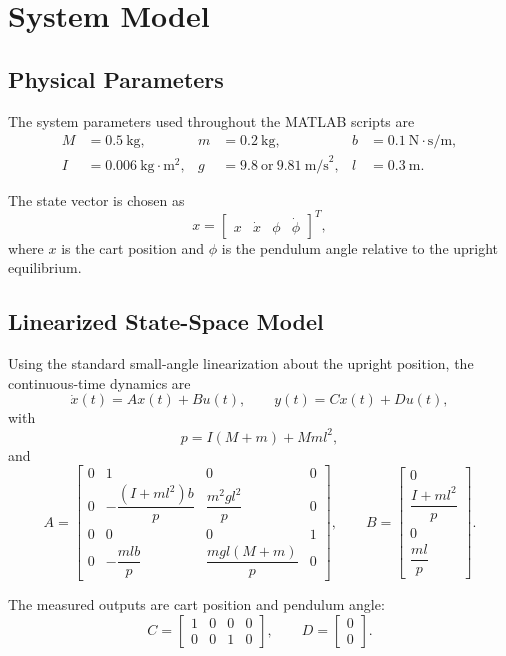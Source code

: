 \documentclass[conference]{IEEEtran}
\begin{document}
\section{System Model}
\subsection{Physical Parameters}
The system parameters used throughout the MATLAB scripts are
\begin{align*}
M &= 0.5~\text{kg}, &
m &= 0.2~\text{kg}, &
b &= 0.1~\text{N}\cdot\text{s/m}, \\
I &= 0.006~\text{kg}\cdot\text{m}^2, &
g &= 9.8~\text{or}~9.81~\text{m/s}^2, &
l &= 0.3~\text{m}.
\end{align*}

The state vector is chosen as
\[
x = \begin{bmatrix}
x & \dot{x} & \phi & \dot{\phi}
\end{bmatrix}^T,
\]
where $x$ is the cart position and $\phi$ is the pendulum angle relative to the upright equilibrium.

\subsection{Linearized State-Space Model}
Using the standard small-angle linearization about the upright position, the continuous-time dynamics are
\[
\dot{x}(t) = A x(t) + B u(t), \qquad y(t) = Cx(t) + Du(t),
\]
with
\[
p = I(M+m)+Mm l^2,
\]
and
\[
A =
\begin{bmatrix}
0 & 1 & 0 & 0 \\
0 & -\dfrac{(I+ml^2)b}{p} & \dfrac{m^2 g l^2}{p} & 0 \\
0 & 0 & 0 & 1 \\
0 & -\dfrac{mlb}{p} & \dfrac{mgl(M+m)}{p} & 0
\end{bmatrix},
\qquad
B =
\begin{bmatrix}
0 \\
\dfrac{I+ml^2}{p} \\
0 \\
\dfrac{ml}{p}
\end{bmatrix}.
\]

The measured outputs are cart position and pendulum angle:
\[
C =
\begin{bmatrix}
1 & 0 & 0 & 0 \\
0 & 0 & 1 & 0
\end{bmatrix},
\qquad
D =
\begin{bmatrix}
0 \\
0
\end{bmatrix}.
\]
\end{document}
